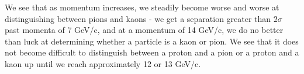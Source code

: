\begin{figure}[]
\centering
{}
\caption[\TODO{}]{}
\label{fig:centeredSeps} 
\end{figure}

\begin{figure}[]
\centering
{}
\caption[\TODO{}]{}
\label{fig:centeredMis} 
\end{figure}

We see that as momentum increases, we steadily become worse and worse at distinguishing between pions and kaons - we get a separation greater than $2 \sigma$ past momenta of 7 GeV/c, and at a momentum of 14 GeV/c, we do no better than luck at determining whether a particle is a kaon or pion.
We see that it does not become difficult to distinguish between a proton and a pion or a proton and a kaon up until we reach approximately 12 or 13 GeV/c. 

